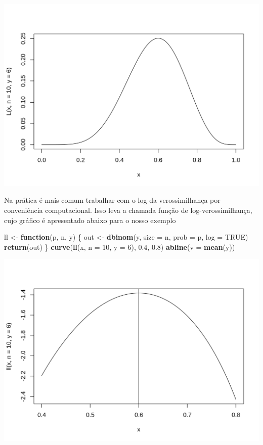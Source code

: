 \documentclass[10pt,a4paper]{book}
\newenvironment{Shaded}{\begin{snugshade}}{\end{snugshade}}
\newcommand{\KeywordTok}[1]{\textcolor[rgb]{0.13,0.29,0.53}{\textbf{#1}}}
\newcommand{\DataTypeTok}[1]{\textcolor[rgb]{0.13,0.29,0.53}{#1}}
\newcommand{\DecValTok}[1]{\textcolor[rgb]{0.00,0.00,0.81}{#1}}
\newcommand{\FloatTok}[1]{\textcolor[rgb]{0.00,0.00,0.81}{#1}}
\newcommand{\StringTok}[1]{\textcolor[rgb]{0.31,0.60,0.02}{#1}}
\newcommand{\OtherTok}[1]{\textcolor[rgb]{0.56,0.35,0.01}{#1}}
\newcommand{\ControlFlowTok}[1]{\textcolor[rgb]{0.13,0.29,0.53}{\textbf{#1}}}
\newcommand{\NormalTok}[1]{#1}
\begin{document}
\begin{center}\includegraphics{figures/unnamed-chunk-374-1} \end{center}

Na prática é mais comum trabalhar com o log da verossimilhança por
conveniência computacional. Isso leva a chamada função de
log-verossimilhança, cujo gráfico é apresentado abaixo para o nosso
exemplo

\begin{Shaded}
\begin{Highlighting}[]
\NormalTok{ll <-}\StringTok{ }\ControlFlowTok{function}\NormalTok{(p, n, y) \{}
\NormalTok{  out <-}\StringTok{ }\KeywordTok{dbinom}\NormalTok{(y, }\DataTypeTok{size =}\NormalTok{ n, }\DataTypeTok{prob =}\NormalTok{ p, }\DataTypeTok{log =} \OtherTok{TRUE}\NormalTok{)}
  \KeywordTok{return}\NormalTok{(out)}
\NormalTok{\}}
\KeywordTok{curve}\NormalTok{(}\KeywordTok{ll}\NormalTok{(x, }\DataTypeTok{n =} \DecValTok{10}\NormalTok{, }\DataTypeTok{y =} \DecValTok{6}\NormalTok{), }\FloatTok{0.4}\NormalTok{, }\FloatTok{0.8}\NormalTok{)}
\KeywordTok{abline}\NormalTok{(}\DataTypeTok{v =} \KeywordTok{mean}\NormalTok{(y))}
\end{Highlighting}
\end{Shaded}

\begin{center}\includegraphics{figures/unnamed-chunk-375-1} \end{center}
\end{document}
